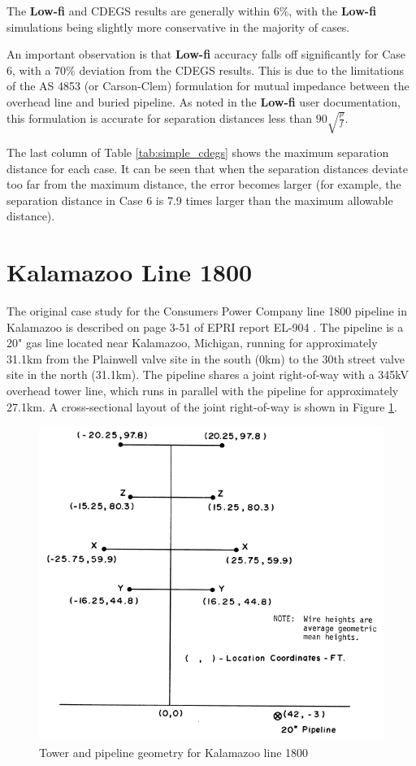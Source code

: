 \documentclass{article}
\begin{document}
The \textbf{Low-fi} and CDEGS results are generally within 6\%, with the \textbf{Low-fi} simulations being slightly more conservative in the majority of cases. 

An important observation is that \textbf{Low-fi} accuracy falls off significantly for Case 6, with a 70\% deviation from the CDEGS results. This is due to the limitations of the AS 4853 (or Carson-Clem) formulation for mutual impedance between the overhead line and buried pipeline. As noted in the \textbf{Low-fi} user documentation, this formulation is accurate for separation distances less than $90 \sqrt{\frac{\rho}{f}}$.

The last column of Table \ref{tab:simple_cdegs} shows the maximum separation distance for each case. It can be seen that when the separation distances deviate too far from the maximum distance, the error becomes larger (for example, the separation distance in Case 6 is 7.9 times larger than the maximum allowable distance).

\newpage
\section{Kalamazoo Line 1800}
The original case study for the Consumers Power Company line 1800 pipeline in Kalamazoo is described on page 3-51 of EPRI report EL-904 \cite{EPRI_1978}. The pipeline is a 20" gas line located near Kalamazoo, Michigan, running for approximately 31.1km from the Plainwell valve site in the south (0km) to the 30th street valve site in the north (31.1km). The pipeline shares a joint right-of-way with a 345kV overhead tower line, which runs in parallel with the pipeline for approximately 27.1km. A cross-sectional layout of the joint right-of-way is shown in Figure \ref{fig:kalamazoo_geo}. 

\begin{figure}[!htp]
\begin{center}
\caption{Tower and pipeline geometry for Kalamazoo line 1800 \cite{EPRI_1978}}
\label{fig:kalamazoo_geo}
\includegraphics[width=0.8\linewidth]{./Figures/kalamazoo_geo.png}
\end{center}
\end{figure}
\end{document}
